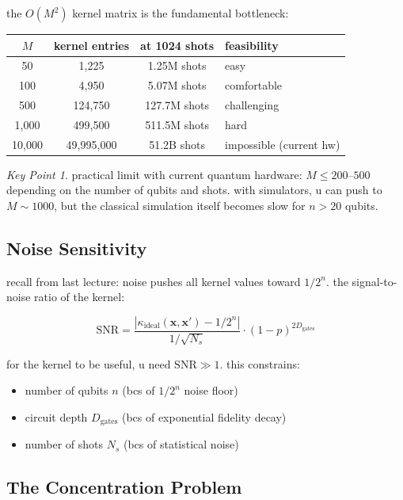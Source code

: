 \documentclass[11pt,a4paper]{article}
\theoremstyle{definition}
\theoremstyle{remark}
\newtheorem*{keypoint}{Key Point}
\begin{document}
the $O(M^2)$ kernel matrix is the fundamental bottleneck:

\begin{center}
\renewcommand{\arraystretch}{1.3}
\begin{tabular}{|c|c|c|l|}
\hline
$M$ & kernel entries & at 1024 shots & \textbf{feasibility} \\
\hline
50 & 1,225 & 1.25M shots & easy \\
\hline
100 & 4,950 & 5.07M shots & comfortable \\
\hline
500 & 124,750 & 127.7M shots & challenging \\
\hline
1,000 & 499,500 & 511.5M shots & hard \\
\hline
10,000 & 49,995,000 & 51.2B shots & impossible (current hw) \\
\hline
\end{tabular}
\end{center}

\begin{keypoint}
practical limit with current quantum hardware: $M \leq 200$--$500$ depending on the number of qubits and shots. with simulators, u can push to $M \sim 1000$, but the classical simulation itself becomes slow for $n > 20$ qubits.
\end{keypoint}

\subsection{Noise Sensitivity}

recall from last lecture: noise pushes all kernel values toward $1/2^n$. the signal-to-noise ratio of the kernel:

\[
\text{SNR} = \frac{|\kappa_{\text{ideal}}(\mathbf{x}, \mathbf{x}') - 1/2^n|}{1/\sqrt{N_s}} \cdot (1-p)^{2D_{\text{gates}}}
\]

for the kernel to be useful, u need $\text{SNR} \gg 1$. this constrains:
\begin{itemize}[leftmargin=*]
    \item number of qubits $n$ (bcs of $1/2^n$ noise floor)
    \item circuit depth $D_{\text{gates}}$ (bcs of exponential fidelity decay)
    \item number of shots $N_s$ (bcs of statistical noise)
\end{itemize}

\subsection{The Concentration Problem}
\end{document}
